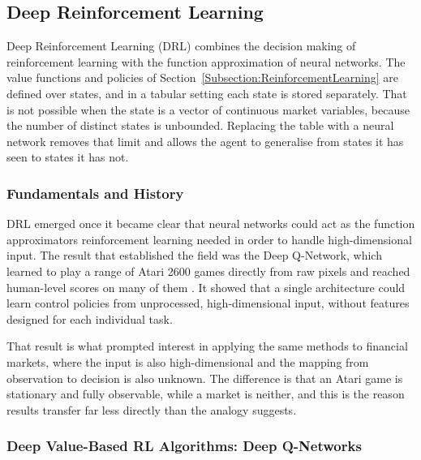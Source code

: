 \subsection{Deep Reinforcement Learning}
\label{Subsection:DeepReinforcementLearning}

Deep Reinforcement Learning (DRL) combines the decision making of reinforcement learning with the function approximation of neural networks. The value functions and policies of Section~\ref{Subsection:ReinforcementLearning} are defined over states, and in a tabular setting each state is stored separately. That is not possible when the state is a vector of continuous market variables, because the number of distinct states is unbounded. Replacing the table with a neural network removes that limit and allows the agent to generalise from states it has seen to states it has not.

\subsubsection{Fundamentals and History}

DRL emerged once it became clear that neural networks could act as the function approximators reinforcement learning needed in order to handle high-dimensional input. The result that established the field was the Deep Q-Network, which learned to play a range of Atari 2600 games directly from raw pixels and reached human-level scores on many of them \cite{mnih_playing_2013, mnih_human-level_2015}. It showed that a single architecture could learn control policies from unprocessed, high-dimensional input, without features designed for each individual task.

That result is what prompted interest in applying the same methods to financial markets, where the input is also high-dimensional and the mapping from observation to decision is also unknown. The difference is that an Atari game is stationary and fully observable, while a market is neither, and this is the reason results transfer far less directly than the analogy suggests.

\subsubsection{Deep Value-Based RL Algorithms: Deep Q-Networks}

